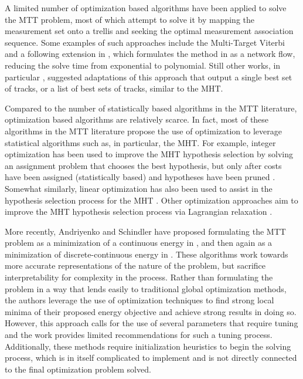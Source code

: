 A limited number of optimization based algorithms have been applied to solve the MTT problem, most of which attempt to solve it by mapping the measurement set onto a trellis and seeking the optimal measurement association sequence. Some examples of such approaches include the Multi-Target Viterbi \cite{Viterbi-1} and a following extension in \cite{Viterbi-2}, which formulates the method in \cite{Viterbi-1} as a network flow, reducing the solve time from exponential to polynomial. Still other works, in particular \cite{Viterbi-3}, suggested adaptations of this approach that output a single best set of tracks, or a list of best sets of tracks, similar to the MHT.  

Compared to the number of statistically based algorithms in the MTT literature, optimization based algorithms are relatively scarce. In fact, most of these algorithms in the MTT literature propose the use of optimization to leverage statistical algorithms such as, in particular, the MHT. For example, integer optimization has been used to improve the MHT hypothesis selection by solving an assignment problem that chooses the best hypothesis, but only after costs have been assigned (statistically based) and hypotheses have been pruned \cite{MHT-IP}. Somewhat similarly, linear optimization has also been used to assist in the hypothesis selection process for the MHT \cite{MHT-LP}. Other optimization approaches aim to improve the MHT hypothesis selection process via Lagrangian relaxation \cite{Lagrangian}. 

More recently, Andriyenko and Schindler have proposed formulating the MTT problem as a minimization of a continuous energy in \cite{Continuous_energy}, and then again as a minimization of discrete-continuous energy in \cite{Discrete-Continuous_energy}. These algorithms work towards more accurate representations of the nature of the problem, but sacrifice interpretability for complexity in the process. Rather than formulating the problem in a way that lends easily to traditional global optimization methods, the authors leverage the use of optimization techniques to find strong local minima of their proposed energy objective and achieve strong results in doing so. However, this approach calls for the use of several parameters that require tuning and the work provides limited recommendations for such a tuning process. Additionally, these methods require initialization heuristics to begin the solving process, which is in itself complicated to implement and is not directly connected to the final optimization problem solved. 

